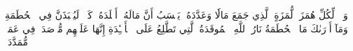 وَيۡلٞ لِّكُلِّ هُمَزَةٖ لُّمَزَةٍ
ٱلَّذِي جَمَعَ مَالٗا وَعَدَّدَهُۥ
يَحۡسَبُ أَنَّ مَالَهُۥٓ أَخۡلَدَهُۥ
كَلَّاۖ لَيُنۢبَذَنَّ فِي ٱلۡحُطَمَةِ
وَمَآ أَدۡرَىٰكَ مَا ٱلۡحُطَمَةُ
نَارُ ٱللَّهِ ٱلۡمُوقَدَةُ
ٱلَّتِي تَطَّلِعُ عَلَى ٱلۡأَفۡـِٔدَةِ
إِنَّهَا عَلَيۡهِم مُّؤۡصَدَةٞ
فِي عَمَدٖ مُّمَدَّدَةِۭ